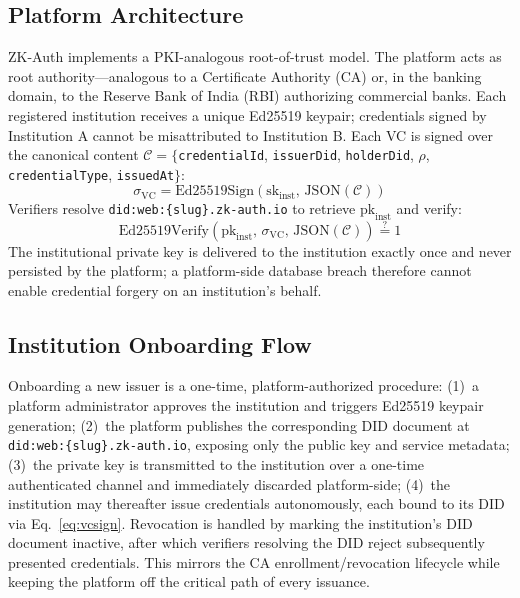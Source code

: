 \documentclass[journal,twoside,10pt]{IEEEtran}
\begin{document}
\subsection{Platform Architecture}
ZK-Auth implements a PKI-analogous root-of-trust model. The platform acts as
root authority---analogous to a Certificate Authority (CA) or, in the
banking domain, to the Reserve Bank of India (RBI) authorizing commercial
banks. Each registered institution receives a unique Ed25519 keypair;
credentials signed by Institution A cannot be misattributed to
Institution B. Each VC is signed over the canonical content
$\mathcal{C} = \{$\texttt{credentialId}, \texttt{issuerDid},
\texttt{holderDid}, $\rho$, \texttt{credentialType}, \texttt{issuedAt}$\}$:
\begin{equation}
  \sigma_{\text{VC}} = \mathrm{Ed25519Sign}(\mathrm{sk}_{\text{inst}},\,
                       \mathrm{JSON}(\mathcal{C}))
  \label{eq:vcsign}
\end{equation}
Verifiers resolve \texttt{did:web:\{slug\}.zk-auth.io} to retrieve
$\mathrm{pk}_{\text{inst}}$ and verify:
\begin{equation}
  \mathrm{Ed25519Verify}(\mathrm{pk}_{\text{inst}},\,
  \sigma_{\text{VC}},\, \mathrm{JSON}(\mathcal{C})) \stackrel{?}{=} 1
  \label{eq:vcverify}
\end{equation}
The institutional private key is delivered to the institution exactly
once and never persisted by the platform; a platform-side database breach
therefore cannot enable credential forgery on an institution's behalf.

\subsection{Institution Onboarding Flow}
Onboarding a new issuer is a one-time, platform-authorized procedure:
(1)~a platform administrator approves the institution and triggers
Ed25519 keypair generation; (2)~the platform publishes the corresponding
DID document at \texttt{did:web:\{slug\}.zk-auth.io}, exposing only the
public key and service metadata; (3)~the private key is transmitted to the
institution over a one-time authenticated channel and immediately discarded
platform-side; (4)~the institution may thereafter issue credentials
autonomously, each bound to its DID via Eq.~\ref{eq:vcsign}. Revocation is
handled by marking the institution's DID document inactive, after which
verifiers resolving the DID reject subsequently presented credentials. This
mirrors the CA enrollment/revocation lifecycle while keeping the platform
off the critical path of every issuance.
\end{document}
